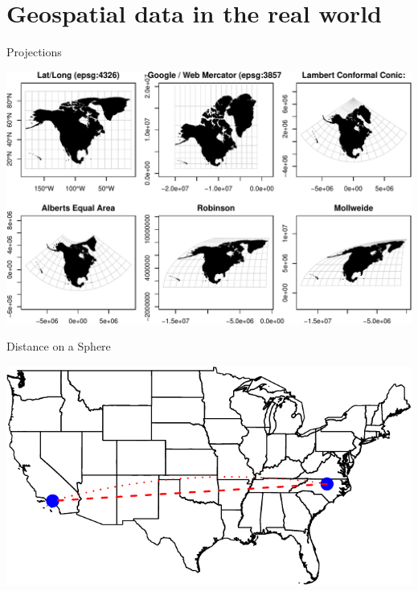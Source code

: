 \documentclass[11pt,ignorenonframetext,]{beamer}
\begin{document}
\hypertarget{geospatial-data-in-the-real-world}{%
\section{Geospatial data in the real
world}\label{geospatial-data-in-the-real-world}}

\begin{frame}{Projections}
\protect\hypertarget{projections}{}

\begin{center}\includegraphics[width=\textwidth]{Lec15_files/figure-beamer/projs-1} \end{center}

\end{frame}

\begin{frame}{Distance on a Sphere}
\protect\hypertarget{distance-on-a-sphere}{}

\begin{center}\includegraphics[width=\textwidth]{Lec15_files/figure-beamer/unnamed-chunk-10-1} \end{center}

\end{frame}
\end{document}

